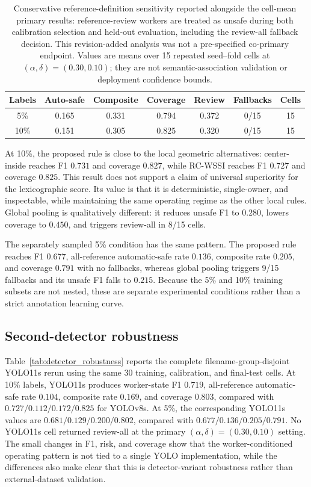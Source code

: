 \documentclass[iicol,pdflatex,sn-mathphys-num]{sn-jnl}
\begin{document}
\begin{table}[t]
\caption{Conservative reference-definition sensitivity reported alongside the cell-mean primary results: reference-review workers are treated as unsafe during both calibration selection and held-out evaluation, including the review-all fallback decision. This revision-added analysis was not a pre-specified co-primary endpoint. Values are means over 15 repeated seed--fold cells at $(\alpha,\delta)=(0.30,0.10)$; they are not semantic-association validation or deployment confidence bounds.}
\label{tab:reviewunsafe}
\centering
\scriptsize
\setlength{\tabcolsep}{5pt}
\begin{tabular}{@{}c c c c c c c@{}}
\toprule
Labels & Auto-safe & Composite & Coverage & Review & Fallbacks & Cells \\
\midrule
5\%  & 0.165 & 0.331 & 0.794 & 0.372 & 0/15 & 15 \\
10\% & 0.151 & 0.305 & 0.825 & 0.320 & 0/15 & 15 \\
\bottomrule
\end{tabular}
\end{table}

At 10\%, the proposed rule is close to the local geometric alternatives: center-inside reaches F1 $0.731$ and coverage $0.827$, while RC-WSSI reaches F1 $0.727$ and coverage $0.825$. This result does not support a claim of universal superiority for the lexicographic score. Its value is that it is deterministic, single-owner, and inspectable, while maintaining the same operating regime as the other local rules. Global pooling is qualitatively different: it reduces unsafe F1 to $0.280$, lowers coverage to $0.450$, and triggers review-all in 8/15 cells.

The separately sampled 5\% condition has the same pattern. The proposed rule reaches F1 $0.677$, all-reference automatic-safe rate $0.136$, composite rate $0.205$, and coverage $0.791$ with no fallbacks, whereas global pooling triggers 9/15 fallbacks and its unsafe F1 falls to $0.215$. Because the 5\% and 10\% training subsets are not nested, these are separate experimental conditions rather than a strict annotation learning curve.

\subsection{Second-detector robustness}

Table~\ref{tab:detector_robustness} reports the complete filename-group-disjoint YOLO11s rerun using the same 30 training, calibration, and final-test cells. At 10\% labels, YOLO11s produces worker-state F1 $0.719$, all-reference automatic-safe rate $0.104$, composite rate $0.169$, and coverage $0.803$, compared with $0.727/0.112/0.172/0.825$ for YOLOv8s. At 5\%, the corresponding YOLO11s values are $0.681/0.129/0.200/0.802$, compared with $0.677/0.136/0.205/0.791$. No YOLO11s cell returned review-all at the primary $(\alpha,\delta)=(0.30,0.10)$ setting. The small changes in F1, risk, and coverage show that the worker-conditioned operating pattern is not tied to a single YOLO implementation, while the differences also make clear that this is detector-variant robustness rather than external-dataset validation.
\end{document}
